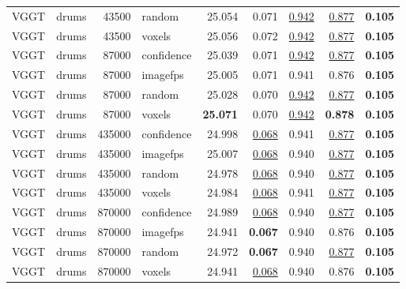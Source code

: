 \begin{table}[H]
\begin{tabular}{llrlrrrrr}
VGGT & drums & 43500 & random & 25.054 & 0.071 & \underline{0.942} & \underline{0.877} & \textbf{0.105} \\
VGGT & drums & 43500 & voxels & 25.056 & 0.072 & \underline{0.942} & \underline{0.877} & \textbf{0.105} \\
VGGT & drums & 87000 & confidence & 25.039 & 0.071 & \underline{0.942} & \underline{0.877} & \textbf{0.105} \\
VGGT & drums & 87000 & imagefps & 25.005 & 0.071 & 0.941 & 0.876 & \textbf{0.105} \\
VGGT & drums & 87000 & random & 25.028 & 0.070 & \underline{0.942} & \underline{0.877} & \textbf{0.105} \\
VGGT & drums & 87000 & voxels & \textbf{25.071} & 0.070 & \underline{0.942} & \textbf{0.878} & \textbf{0.105} \\
VGGT & drums & 435000 & confidence & 24.998 & \underline{0.068} & 0.941 & \underline{0.877} & \textbf{0.105} \\
VGGT & drums & 435000 & imagefps & 25.007 & \underline{0.068} & 0.940 & \underline{0.877} & \textbf{0.105} \\
VGGT & drums & 435000 & random & 24.978 & \underline{0.068} & 0.940 & \underline{0.877} & \textbf{0.105} \\
VGGT & drums & 435000 & voxels & 24.984 & \underline{0.068} & 0.941 & \underline{0.877} & \textbf{0.105} \\
VGGT & drums & 870000 & confidence & 24.989 & \underline{0.068} & 0.940 & \underline{0.877} & \textbf{0.105} \\
VGGT & drums & 870000 & imagefps & 24.941 & \textbf{0.067} & 0.940 & 0.876 & \textbf{0.105} \\
VGGT & drums & 870000 & random & 24.972 & \textbf{0.067} & 0.940 & \underline{0.877} & \textbf{0.105} \\
VGGT & drums & 870000 & voxels & 24.941 & \underline{0.068} & 0.940 & 0.876 & \textbf{0.105} \\
\bottomrule
\end{tabular}
\end{table}